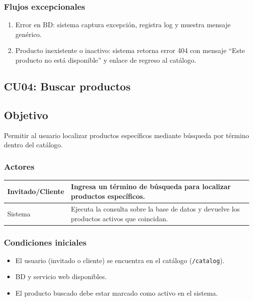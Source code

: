 \documentclass[12pt,a4paper]{article}
\begin{document}
\subsubsection*{Flujos excepcionales}
\begin{enumerate}[label=FE-\arabic*]
    \item Error en BD: sistema captura excepción, registra log y muestra mensaje genérico.
    \item Producto inexistente o inactivo: sistema retorna error 404 con mensaje “Este producto no está disponible” y enlace de regreso al catálogo.
\end{enumerate}


\subsection{CU04: Buscar productos}
\subsection*{Objetivo}
Permitir al usuario localizar productos específicos mediante búsqueda por término dentro del catálogo.

\subsubsection*{Actores}
\begin{longtable}{|l|p{10cm}|}
    \hline
    Invitado/Cliente & Ingresa un término de búsqueda para localizar productos específicos.                       \\ \hline
    Sistema          & Ejecuta la consulta sobre la base de datos y devuelve los productos activos que coincidan. \\ \hline
\end{longtable}

\subsubsection*{Condiciones iniciales}
\begin{itemize}[label=--]
    \item El usuario (invitado o cliente) se encuentra en el catálogo (\texttt{/catalog}).
    \item BD y servicio web disponibles.
    \item El producto buscado debe estar marcado como activo en el sistema.
\end{itemize}
\end{document}
